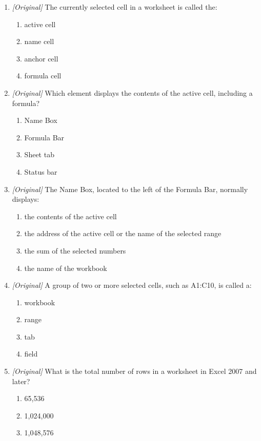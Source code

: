 \documentclass[11pt]{article}
\begin{document}
\begin{enumerate}[label=\textbf{Q\arabic*.}, leftmargin=*]
\begin{enumerate}[label=\Alph*.]
    \item B\_5
  \end{enumerate}
\item \textit{[Original]} The currently selected cell in a worksheet is
  called the:
  \begin{enumerate}[label=\Alph*.]
    \item active cell
    \item name cell
    \item anchor cell
    \item formula cell
  \end{enumerate}
\item \textit{[Original]} Which element displays the contents of the active
  cell, including a formula?
  \begin{enumerate}[label=\Alph*.]
    \item Name Box
    \item Formula Bar
    \item Sheet tab
    \item Status bar
  \end{enumerate}
\item \textit{[Original]} The Name Box, located to the left of the Formula
  Bar, normally displays:
  \begin{enumerate}[label=\Alph*.]
    \item the contents of the active cell
    \item the address of the active cell or the name of the selected range
    \item the sum of the selected numbers
    \item the name of the workbook
  \end{enumerate}
\item \textit{[Original]} A group of two or more selected cells, such as
  A1:C10, is called a:
  \begin{enumerate}[label=\Alph*.]
    \item workbook
    \item range
    \item tab
    \item field
  \end{enumerate}
\item \textit{[Original]} What is the total number of rows in a worksheet in
  Excel 2007 and later?
  \begin{enumerate}[label=\Alph*.]
    \item 65,536
    \item 1,024,000
    \item 1,048,576

\end{enumerate}
\end{enumerate}
\end{document}
